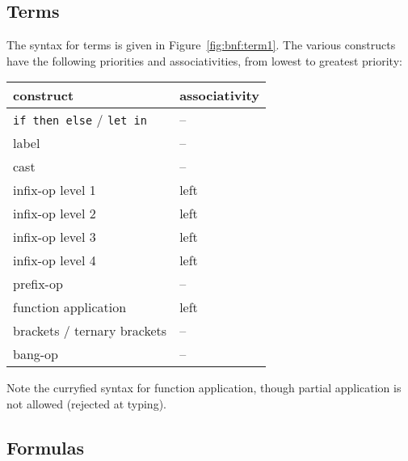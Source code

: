 \subsection{Terms}

The syntax for terms is given in Figure~\ref{fig:bnf:term1}.
The various constructs have the following priorities and
associativities, from lowest to greatest priority:
\begin{center}
  \begin{tabular}{|l|l|}
    \hline
    construct & associativity \\
    \hline\hline
    \texttt{if then else} / \texttt{let in} & -- \\
    label & -- \\
    cast  & -- \\
    infix-op level 1 & left \\
    infix-op level 2 & left \\
    infix-op level 3 & left \\
    infix-op level 4 & left \\
    prefix-op     & --   \\
    function application & left \\
    brackets / ternary brackets & -- \\
    bang-op       & --   \\
    \hline
  \end{tabular}
\end{center}

Note the curryfied syntax for function application, though partial
application is not allowed (rejected at typing).

\subsection{Formulas}

